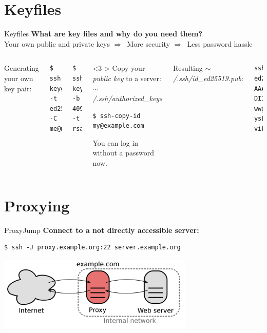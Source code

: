 \documentclass[10pt, graphics, aspectratio=169, table]{beamer}
\newcommand{\ra}{$\Rightarrow$\ }
\begin{document}
\section{Keyfiles}
\begin{frame}[fragile, t]{Keyfiles}
	\centering
	\textbf{What are key files and why do you need them?} \\
	Your own public and private keys \ra More security \ra Less password hassle
	\vspace{1ex}
	\pause
	\begin{columns}[t]
		Generating your own key pair:
		\begin{lstlisting}
$ ssh-keygen -t ed25519 -C me@mypc
		\end{lstlisting}
		\begin{lstlisting}
$ ssh-keygen -b 4096 -t rsa
		\end{lstlisting}

		\begin{onlyenv}<3->
			Copy your \emph{public key} to a server: \textit{$\sim$/.ssh/authorized\_keys}
			\begin{lstlisting}
$ ssh-copy-id my@example.com
			\end{lstlisting}
			You can log in without a password now.
		\end{onlyenv}

		Resulting \textit{$\sim$/.ssh/id\_ed25519.pub}:
		\begin{lstlisting}
ssh-ed25519 AAAAC3NzaC1lZ
DI1NTE5AAAAIJDzhzcMdEg7Nz
wwgB0bdOP1pDSKv5fsN4l4q8Y
ysLLX viktor@nerd101
		\end{lstlisting}
	\end{columns}
\end{frame}

\section{Proxying}
\begin{frame}[fragile]{ProxyJump}
	\textbf{Connect to a not directly accessible server:}
	\begin{lstlisting}
$ ssh -J proxy.example.org:22 server.example.org
	\end{lstlisting}
	\begin{center}
		\includegraphics[width=0.7\textwidth]{img/proxy.png} \cite{proxy}
	\end{center}
\end{frame}
\end{document}
